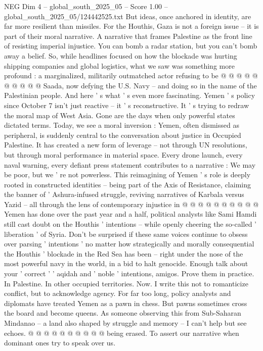 \begin{textsample}{NEG Dim 4 – global\_south\_2025\_05 – Score 1.00 – global\_south\_2025\_05/124442525.txt}
But ideas, once anchored in identity, are far more resilient than missiles.
For the Houthis, Gaza is not a foreign issue -- it is part of their moral narrative.
A narrative that frames Palestine as the front line of resisting imperial injustice.
You can bomb a radar station, but you can't bomb away a belief.
So, while headlines focused on how the blockade was hurting shipping companies and global logistics, what we saw was something more profound : a marginalized, militarily outmatched actor refusing to be @ @ @ @ @ @ @ @ @ @ Saada, now defying the U.S.
Navy -- and doing so in the name of the Palestinian people.
And here ' s what ' s even more fascinating.
Yemen ' s policy since October 7 isn't just reactive -- it ' s reconstructive.
It ' s trying to redraw the moral map of West Asia.
Gone are the days when only powerful states dictated terms.
Today, we see a moral inversion : Yemen, often dismissed as peripheral, is suddenly central to the conversation about justice in Occupied Palestine.
It has created a new form of leverage -- not through UN resolutions, but through moral performance in material space.
Every drone launch, every naval warning, every defiant press statement contributes to a narrative : We may be poor, but we ' re not powerless.
This reimagining of Yemen ' s role is deeply rooted in constructed identities -- being part of the Axis of Resistance, claiming the banner of ' Ashura-infused struggle, reviving narratives of Karbala versus Yazid -- all through the lens of contemporary injustice in @ @ @ @ @ @ @ @ @ @ Yemen has done over the past year and a half, political analysts like Sami Hamdi still cast doubt on the Houthis ' intentions -- while openly cheering the so-called ' liberation ' of Syria.
Don't be surprised if these same voices continue to obsess over parsing ' intentions ' no matter how strategically and morally consequential the Houthis ' blockade in the Red Sea has been -- right under the nose of the most powerful navy in the world, in a bid to halt genocide.
Enough talk about your ' correct ' ' aqidah and ' noble ' intentions, amigos.
Prove them in practice.
In Palestine.
In other occupied territories.
Now.
I write this not to romanticize conflict, but to acknowledge agency.
For far too long, policy analysts and diplomats have treated Yemen as a pawn in chess.
But pawns sometimes cross the board and become queens.
As someone observing this from Sub-Saharan Mindanao -- a land also shaped by struggle and memory -- I can't help but see echoes. @ @ @ @ @ @ @ @ @ @ being erased.
To assert our narrative when dominant ones try to speak over us.

\end{textsample}
